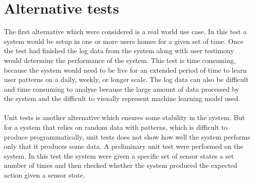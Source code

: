\section{Alternative tests}
The first alternative which were considered is a real world use case. In this test a system would be setup in one or more users homes for a given set of time. Once the test had finished the log data from the system along with user testimony would determine the performance of the system. This test is time consuming, because the system would need to be live for an extended period of time to learn user patterns on a daily, weekly, or longer scale. The log data can also be difficult and time consuming to analyse because the large amount of data processed by the system and the difficult to visually represent machine learning model used.
\\\\
Unit tests is another alternative which ensures some stability in the system. But for a system that relies on random data with patterns, which is difficult to produce programmatically, unit tests does not show how well the system performs only that it produces some data. A preliminary unit test were performed on the system. In this test the system were given a specific set of sensor states a set number of times and then checked whether the system produced the expected action given a sensor state.
